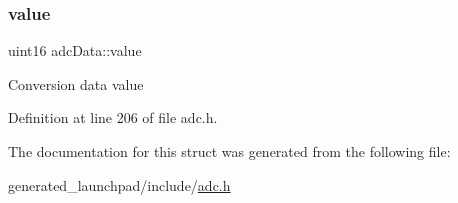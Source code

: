 \subsubsection{\texorpdfstring{value}{value}}
{\footnotesize\ttfamily uint16 adc\+Data\+::value}

Conversion data value 

Definition at line 206 of file adc.\+h.



The documentation for this struct was generated from the following file\+:\begin{DoxyCompactItemize}
\item 
generated\+\_\+launchpad/include/\mbox{\hyperlink{adc_8h}{adc.\+h}}\end{DoxyCompactItemize}
